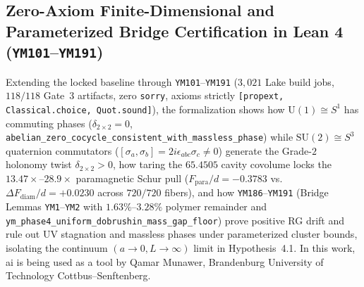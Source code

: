 \documentclass[11pt,a4paper]{article}
\theoremstyle{definition}
\theoremstyle{remark}
\begin{document}
\subsection{Zero-Axiom Finite-Dimensional and Parameterized Bridge Certification in Lean 4 (\texttt{YM101}--\texttt{YM191})}
Extending the locked baseline through \texttt{YM101}--\texttt{YM191} ($3{,}021$ Lake build jobs, $118/118$ Gate~3 artifacts, zero \texttt{sorry}, axioms strictly \texttt{[propext, Classical.choice, Quot.sound]}), the formalization shows how $\mathrm{U}(1) \cong S^1$ has commuting phases ($\delta_{2\times 2} = 0$, \texttt{abelian\_zero\_cocycle\_consistent\_with\_massless\_phase}) while $\mathrm{SU}(2) \cong S^3$ quaternion commutators ($[\sigma_a, \sigma_b] = 2i\epsilon_{abc}\sigma_c \neq 0$) generate the Grade-$2$ holonomy twist $\delta_{2\times 2} > 0$, how taring the $65.4505$ cavity covolume locks the $13.47\times$--$28.9\times$ paramagnetic Schur pull ($F_{\mathrm{para}}/d = -0.3783$ vs.\ $\Delta F_{\mathrm{diam}}/d = +0.0230$ across $720/720$ fibers), and how \texttt{YM186}--\texttt{YM191} (Bridge Lemmas \texttt{YM1}--\texttt{YM2} with $1.63\%$--$3.28\%$ polymer remainder and \texttt{ym\_phase4\_uniform\_dobrushin\_mass\_gap\_floor}) prove positive RG drift and rule out UV stagnation and massless phases under parameterized cluster bounds, isolating the continuum $(a \to 0, L \to \infty)$ limit in Hypothesis~4.1. In this work, ai is being used as a tool by Qamar Munawer, Brandenburg University of Technology Cottbus--Senftenberg.



\end{document}
